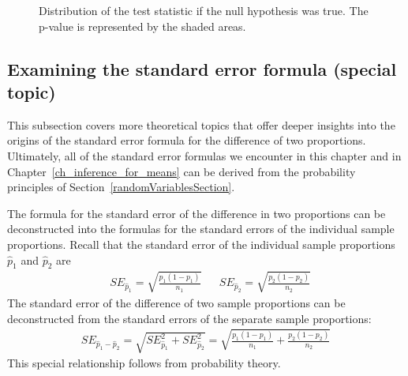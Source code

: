 \begin{figure}[h]
  \centering
  \caption{Distribution of the test statistic if the null
      hypothesis was true.
      The p-value is represented by the shaded areas.}
  \label{bladesTwoSampleHTPValueQC}
\end{figure}


\D{\newpage}

\subsection{Examining the standard error formula
    (special topic)}

This subsection covers more theoretical topics
that offer deeper insights into the origins of the
standard error formula for the difference of two
proportions.
Ultimately, all of the standard error formulas
we encounter in this chapter and in
Chapter~\ref{ch_inference_for_means}
can be derived from the probability principles of
Section~\ref{randomVariablesSection}.

The formula for the standard error of the difference
in two proportions can be deconstructed into the formulas
for the standard errors of the individual sample proportions.
Recall that the standard error of the individual
sample proportions $\hat{p}_1$ and $\hat{p}_2$ are
\begin{align*}
&SE_{\hat{p}_1} = \sqrt{\frac{{p}_1 (1 - {p}_1)}{n_1}}
&&SE_{\hat{p}_2} = \sqrt{\frac{{p}_2 (1 - {p}_2)}{n_2}}
\end{align*}
The standard error of the difference of two sample proportions
can be deconstructed from the standard errors of the separate
sample proportions:
\begin{align*}
SE_{\hat{p}_{1} - \hat{p}_{2}}
	= \sqrt{SE_{\hat{p}_1}^2 + SE_{\hat{p}_2}^2}
	= \sqrt{\frac{{p}_1 (1 - {p}_1)}{n_1}
	    + \frac{{p}_2 (1 - {p}_2)}{n_2}}
\end{align*}
This special relationship follows from probability theory.

